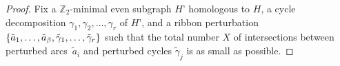 \documentclass[letterpaper,review]{siamart190516}
\def\Z{\mathbb{Z}}
\let\eps\varepsilon
\def\jnote#1{\textcolor{orange}{Jeff: #1}}
\begin{document}
\begin{proof}
%
%
Fix a $\Z_2$-minimal even subgraph $H’$ homologous to $H$, a cycle decomposition $\gamma_1, \gamma_2, \dots, \gamma_r$ of $H’$, and a ribbon perturbation $\{ \tilde{a}_1, \dots, \tilde{a}_\beta, \tilde\gamma_1, \dots, \tilde\gamma_r \}$ such that the total number $X$ of intersections between perturbed arcs~$\tilde{a}_i$ and perturbed cycles $\tilde\gamma_j$ is as small as possible.


\end{proof}
\end{document}
